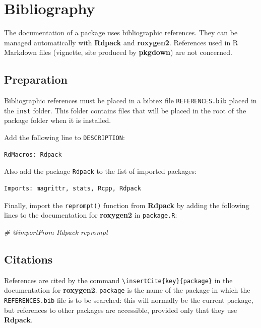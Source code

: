 \documentclass[
  12pt,
  american,
  a4paper,
  extrafontsizes,onecolumn,openright
  ]{memoir}
\newenvironment{Shaded}{\begin{snugshade}}{\end{snugshade}}
\newcommand{\CommentTok}[1]{\textcolor[rgb]{0.56,0.35,0.01}{\textit{#1}}}
\begin{document}
\hypertarget{bibliography-1}{%
\section{Bibliography}\label{bibliography-1}}

The documentation of a package uses bibliographic references.
They can be managed automatically with \textbf{Rdpack} and \textbf{roxygen2}.
References used in R Markdown files (vignette, site produced by \textbf{pkgdown}) are not concerned.

\hypertarget{preparation}{%
\subsection{Preparation}\label{preparation}}

Bibliographic references must be placed in a bibtex file \texttt{REFERENCES.bib} placed in the \texttt{inst} folder.
This folder contains files that will be placed in the root of the package folder when it is installed.

Add the following line to \texttt{DESCRIPTION}:

\begin{verbatim}
RdMacros: Rdpack
\end{verbatim}

Also add the package \texttt{Rdpack} to the list of imported packages:

\begin{verbatim}
Imports: magrittr, stats, Rcpp, Rdpack
\end{verbatim}

Finally, import the \texttt{reprompt()} function from \textbf{Rdpack} by adding the following lines to the documentation for \textbf{roxygen2} in \texttt{package.R}:

\scriptsize

\begin{Shaded}
\begin{Highlighting}[]
\CommentTok{\#\textquotesingle{} @importFrom Rdpack reprompt}
\end{Highlighting}
\end{Shaded}

\normalsize

\hypertarget{citations}{%
\subsection{Citations}\label{citations}}

References are cited by the command \texttt{\textbackslash{}insertCite\{key\}\{package\}} in the documentation for \textbf{roxygen2}.
\texttt{package} is the name of the package in which the \texttt{REFERENCES.bib} file is to be searched: this will normally be the current package, but references to other packages are accessible, provided only that they use \textbf{Rdpack}.
\end{document}
